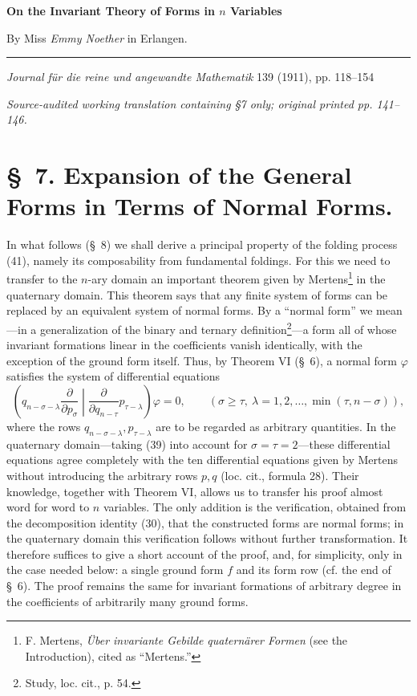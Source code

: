 \documentclass[10pt]{article}
\begin{document}
\begin{center}
{\Large\bfseries On the Invariant Theory of Forms in $n$ Variables}\par
\vspace{0.5em}
By Miss \emph{Emmy Noether} in Erlangen.\par
\medskip
\rule{0.22\linewidth}{0.4pt}\par
\vspace{0.7em}
\emph{Journal f\"ur die reine und angewandte Mathematik} 139 (1911), pp. 118--154\par
\smallskip
{\small\itshape Source-audited working translation containing \S7 only; original printed pp. 141--146.}
\end{center}

\section*{\S\ 7. Expansion of the General Forms in Terms of Normal Forms.}

In what follows (\S\ 8) we shall derive a principal property of the folding
process (41), namely its composability from fundamental foldings. For this we
need to transfer to the $n$-ary domain an important theorem given by
Mertens\footnote{F. Mertens, \emph{\"Uber invariante Gebilde quatern\"arer
Formen} (see the Introduction), cited as ``Mertens.''} in the quaternary
domain. This theorem says that any finite system of forms can be replaced by
an equivalent system of normal forms. By a ``normal form'' we mean---in a
generalization of the binary and ternary definition\footnote{Study, loc.
cit., p. 54.}---a form all of whose invariant formations linear in the
coefficients vanish identically, with the exception of the ground form
itself. Thus, by Theorem VI (\S\ 6), a normal form $\varphi$ satisfies the
system of differential equations
\begin{equation}
 \left(q_{n-\sigma-\lambda}\frac{\partial}{\partial p_\sigma}
 \middle|\frac{\partial}{\partial q_{n-\tau}}p_{\tau-\lambda}\right)
 \varphi=0,
 \qquad(\sigma\geq\tau,\ \lambda=1,2,\ldots,
 \min(\tau,n-\sigma)),
\tag{46}
\end{equation}
where the rows $q_{n-\sigma-\lambda},p_{\tau-\lambda}$ are to be regarded as
arbitrary quantities. In the quaternary domain---taking (39) into account
for $\sigma=\tau=2$---these differential equations agree completely with
the ten differential equations given by Mertens without introducing the
arbitrary rows $p,q$ (loc. cit., formula 28). Their knowledge, together with
Theorem VI, allows us to transfer his proof almost word for word to $n$
variables. The only addition is the verification, obtained from the
decomposition identity (30), that the constructed forms are normal forms; in
the quaternary domain this verification follows without further
transformation. It therefore suffices to give a short account of the proof,
and, for simplicity, only in the case needed below: a single ground form $f$
and its form row (cf. the end of \S\ 6). The proof remains the same for
invariant formations of arbitrary degree in the coefficients of arbitrarily
many ground forms.
\end{document}
